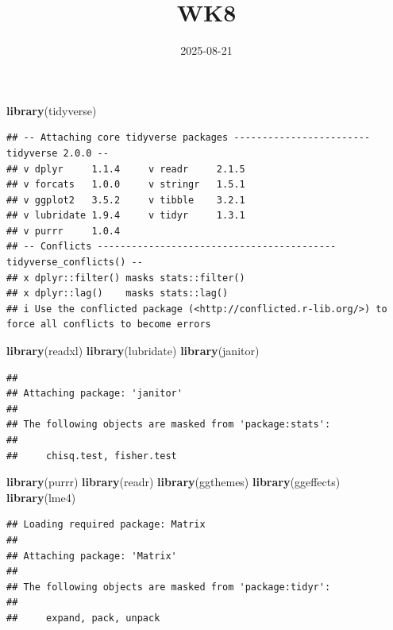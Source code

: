 \documentclass[
]{article}
\title{WK8}
\author{}
\date{\vspace{-2.5em}2025-08-21}
\newenvironment{Shaded}{\begin{snugshade}}{\end{snugshade}}
\newcommand{\FunctionTok}[1]{\textcolor[rgb]{0.13,0.29,0.53}{\textbf{#1}}}
\newcommand{\NormalTok}[1]{#1}
\begin{document}
\maketitle

\begin{Shaded}
\begin{Highlighting}[]
\FunctionTok{library}\NormalTok{(tidyverse)}
\end{Highlighting}
\end{Shaded}

\begin{verbatim}
## -- Attaching core tidyverse packages ------------------------ tidyverse 2.0.0 --
## v dplyr     1.1.4     v readr     2.1.5
## v forcats   1.0.0     v stringr   1.5.1
## v ggplot2   3.5.2     v tibble    3.2.1
## v lubridate 1.9.4     v tidyr     1.3.1
## v purrr     1.0.4     
## -- Conflicts ------------------------------------------ tidyverse_conflicts() --
## x dplyr::filter() masks stats::filter()
## x dplyr::lag()    masks stats::lag()
## i Use the conflicted package (<http://conflicted.r-lib.org/>) to force all conflicts to become errors
\end{verbatim}

\begin{Shaded}
\begin{Highlighting}[]
\FunctionTok{library}\NormalTok{(readxl)}
\FunctionTok{library}\NormalTok{(lubridate)}
\FunctionTok{library}\NormalTok{(janitor)}
\end{Highlighting}
\end{Shaded}

\begin{verbatim}
## 
## Attaching package: 'janitor'
## 
## The following objects are masked from 'package:stats':
## 
##     chisq.test, fisher.test
\end{verbatim}

\begin{Shaded}
\begin{Highlighting}[]
\FunctionTok{library}\NormalTok{(purrr)}
\FunctionTok{library}\NormalTok{(readr)}
\FunctionTok{library}\NormalTok{(ggthemes)}
\FunctionTok{library}\NormalTok{(ggeffects)}
\FunctionTok{library}\NormalTok{(lme4)}
\end{Highlighting}
\end{Shaded}

\begin{verbatim}
## Loading required package: Matrix
## 
## Attaching package: 'Matrix'
## 
## The following objects are masked from 'package:tidyr':
## 
##     expand, pack, unpack
\end{verbatim}
\end{document}
